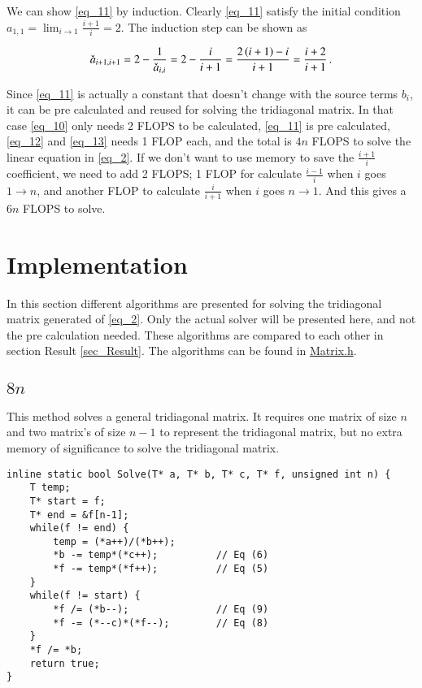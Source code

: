 \documentclass[11pt,english,a4paper]{article}
\begin{document}
\begin{flushleft}
We can show \eqref{eq_11} by induction. Clearly \eqref{eq_11} satisfy the initial condition $a_{1,1} = \lim_{i\to 1} \frac{i+1}{i} = 2$. The induction step can be shown as 

\begin{align*}
\check a_{i+1,i+1} = 2 - \frac{1}{\check a_{i,i}} = 2 - \frac{i}{i+1} = \frac{2\left({i+1}\right)-i}{i+1} = \frac{i+2}{i+1} \,.
\end{align*}

Since \eqref{eq_11} is actually a constant that doesn't change with the source terms $b_i$, it can be pre calculated and reused for solving the tridiagonal matrix. In that case \eqref{eq_10} only needs 2 FLOPS to be calculated, \eqref{eq_11} is pre calculated, \eqref{eq_12} and \eqref{eq_13} needs 1 FLOP each, and the total is $4n$ FLOPS to solve the linear equation in \eqref{eq_2}. If we don't want to use memory to save the $\frac{i+1}{i}$ coefficient, we need to add 2 FLOPS; 1 FLOP  for calculate $\frac{i-1}{i}$ when $i$ goes $1\to n$, and another FLOP to calculate $\frac{i}{i+1}$ when $i$ goes $n\to 1$. And this gives a $6n$ FLOPS to solve.

\section{Implementation}\label{sec_Implementation}

In this section different algorithms are presented for solving the tridiagonal matrix generated of \eqref{eq_2}. Only the actual solver will be presented here, and not the pre calculation needed. These algorithms are compared to each other in section Result \ref{sec_Result}. The algorithms can be found in \href{https://github.com/Eimund/UiO/blob/master/FYS4150/Project%201/A/project1/Matrix.h}{Matrix.h}.

\subsection{$8n$}

This method solves a general tridiagonal matrix. It requires one matrix of size $n$ and two matrix's of size $n-1$ to represent the tridiagonal matrix, but no extra memory of significance to solve the tridiagonal matrix.

\begin{lstlisting}[frame=single, caption={\texttt{Matrix<MatrixType::TridiagonalGeneral, T>::Solve}}]  
inline static bool Solve(T* a, T* b, T* c, T* f, unsigned int n) {
	T temp;
	T* start = f;
	T* end = &f[n-1];
	while(f != end) {
		temp = (*a++)/(*b++);
		*b -= temp*(*c++);          // Eq (6)
		*f -= temp*(*f++);          // Eq (5)
	}
	while(f != start) {
		*f /= (*b--);               // Eq (9)
		*f -= (*--c)*(*f--);        // Eq (8)
	}
	*f /= *b;
	return true;
}
\end{lstlisting}


\end{flushleft}
\end{document}
